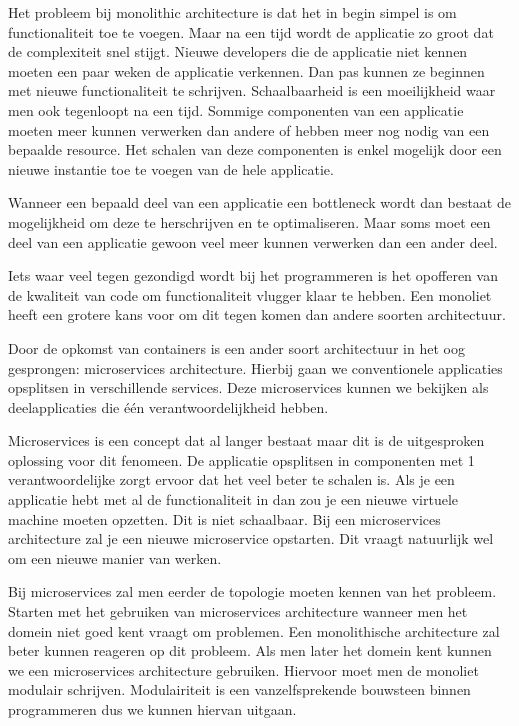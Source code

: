 \documentclass[pdftex,a4paper,12pt,twoside]{report}
\begin{document}
Het probleem bij monolithic architecture is dat het in begin simpel is om functionaliteit toe te voegen. Maar na een tijd wordt de applicatie zo groot dat de complexiteit snel stijgt. Nieuwe developers die de applicatie niet kennen moeten een paar weken de applicatie verkennen. Dan pas kunnen ze beginnen met nieuwe functionaliteit te schrijven. Schaalbaarheid is een moeilijkheid waar men ook tegenloopt na een tijd. Sommige componenten van een applicatie moeten meer kunnen verwerken dan andere of hebben meer nog nodig van een bepaalde resource. Het schalen van deze componenten is enkel mogelijk door een nieuwe instantie toe te voegen van de hele applicatie. 

Wanneer een bepaald deel van een applicatie een bottleneck wordt dan bestaat de mogelijkheid om deze te herschrijven en te optimaliseren. Maar soms moet een deel van een applicatie gewoon veel meer kunnen verwerken dan een ander deel. 

Iets waar veel tegen gezondigd wordt bij het programmeren is het opofferen van de kwaliteit van code om functionaliteit vlugger klaar te hebben. Een monoliet heeft een grotere kans voor om dit tegen komen dan andere soorten architectuur. 

Door de opkomst van containers is een ander soort architectuur in het oog gesprongen: microservices architecture. Hierbij gaan we conventionele applicaties opsplitsen in verschillende services. Deze microservices kunnen we bekijken als deelapplicaties die één verantwoordelijkheid hebben.

Microservices is een concept dat al langer bestaat maar dit is de uitgesproken oplossing voor dit fenomeen. De applicatie opsplitsen in componenten met 1 verantwoordelijke zorgt ervoor dat het veel beter te schalen is. Als je een applicatie hebt met al de functionaliteit in dan zou je een nieuwe virtuele machine moeten opzetten. Dit is niet schaalbaar. Bij een microservices architecture zal je een nieuwe microservice opstarten. Dit vraagt natuurlijk wel om een nieuwe manier van werken.

Bij microservices zal men eerder de topologie moeten kennen van het probleem. Starten met het gebruiken van microservices architecture wanneer men het domein niet goed kent vraagt om problemen. Een monolithische architecture zal beter kunnen reageren op dit probleem. Als men later het domein kent kunnen we een microservices architecture gebruiken. Hiervoor moet men de monoliet modulair schrijven. Modulairiteit is een vanzelfsprekende bouwsteen binnen programmeren dus we kunnen hiervan uitgaan.
\end{document}
